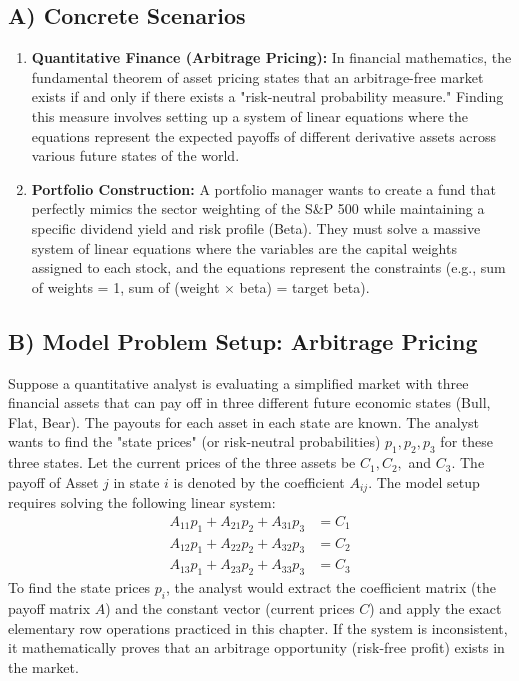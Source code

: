 \documentclass[11pt]{article}
\begin{document}
\subsection{A) Concrete Scenarios}
\begin{enumerate}
    \item \textbf{Quantitative Finance (Arbitrage Pricing):} In financial mathematics, the fundamental theorem of asset pricing states that an arbitrage-free market exists if and only if there exists a "risk-neutral probability measure." Finding this measure involves setting up a system of linear equations where the equations represent the expected payoffs of different derivative assets across various future states of the world.
    \item \textbf{Portfolio Construction:} A portfolio manager wants to create a fund that perfectly mimics the sector weighting of the S\&P 500 while maintaining a specific dividend yield and risk profile (Beta). They must solve a massive system of linear equations where the variables are the capital weights assigned to each stock, and the equations represent the constraints (e.g., sum of weights = 1, sum of (weight $\times$ beta) = target beta).
\end{enumerate}

\subsection{B) Model Problem Setup: Arbitrage Pricing}
Suppose a quantitative analyst is evaluating a simplified market with three financial assets that can pay off in three different future economic states (Bull, Flat, Bear). The payouts for each asset in each state are known. The analyst wants to find the "state prices" (or risk-neutral probabilities) $p_1, p_2, p_3$ for these three states. 
Let the current prices of the three assets be $C_1, C_2,$ and $C_3$.
The payoff of Asset $j$ in state $i$ is denoted by the coefficient $A_{ij}$.
The model setup requires solving the following linear system:
\begin{align*}
    A_{11}p_1 + A_{21}p_2 + A_{31}p_3 &= C_1 \\
    A_{12}p_1 + A_{22}p_2 + A_{32}p_3 &= C_2 \\
    A_{13}p_1 + A_{23}p_2 + A_{33}p_3 &= C_3
\end{align*}
To find the state prices $p_i$, the analyst would extract the coefficient matrix (the payoff matrix $A$) and the constant vector (current prices $C$) and apply the exact elementary row operations practiced in this chapter. If the system is inconsistent, it mathematically proves that an arbitrage opportunity (risk-free profit) exists in the market.
\end{document}
